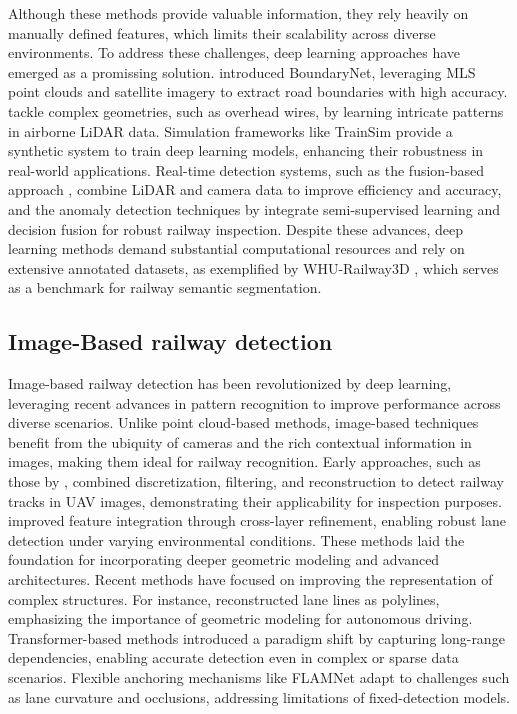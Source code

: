 Although these methods provide valuable information, they rely heavily on manually defined features, which limits their scalability across diverse environments. 
To address these challenges, deep learning approaches have emerged as a promissing solution.
\cite{Ma2022} introduced BoundaryNet, leveraging MLS point clouds and satellite imagery to extract road boundaries with high accuracy. 
\cite{Zhang2022} tackle complex geometries, such as overhead wires, by learning intricate patterns in airborne LiDAR data. 
Simulation frameworks like TrainSim \citep{DAmico2023} provide a synthetic system to train deep learning models, enhancing their robustness in real-world applications.
Real-time detection systems, such as the fusion-based approach \citep{Tang2024}, combine LiDAR and camera data to improve efficiency and accuracy, and the anomaly detection techniques by \cite{Ge2024} integrate semi-supervised learning and decision fusion for robust railway inspection.
Despite these advances, deep learning methods demand substantial computational resources and rely on extensive annotated datasets, as exemplified by WHU-Railway3D \citep{Qiu2024}, which serves as a benchmark for railway semantic segmentation. 

\subsection{Image-Based railway detection}
Image-based railway detection has been revolutionized by deep learning, leveraging recent advances in pattern recognition to improve performance across diverse scenarios. Unlike point cloud-based methods, image-based techniques benefit from the ubiquity of cameras and the rich contextual information in images, making them ideal for railway recognition.
Early approaches, such as those by \cite{Yang2022b}, combined discretization, filtering, and reconstruction to detect railway tracks in UAV images, demonstrating their applicability for inspection purposes.
\cite{Zheng2022} improved feature integration through cross-layer refinement, enabling robust lane detection under varying environmental conditions. These methods laid the foundation for incorporating deeper geometric modeling and advanced architectures.
Recent methods have focused on improving the representation of complex structures.
For instance, \cite{Chae2023} reconstructed lane lines as polylines, emphasizing the importance of geometric modeling for autonomous driving. Transformer-based methods \citep{Chen2023,Luo2023,Yao2023} introduced a paradigm shift by capturing long-range dependencies, enabling accurate detection even in complex or sparse data scenarios. Flexible anchoring mechanisms like FLAMNet \citep{Ran2023} adapt to challenges such as lane curvature and occlusions, addressing limitations of fixed-detection models.

